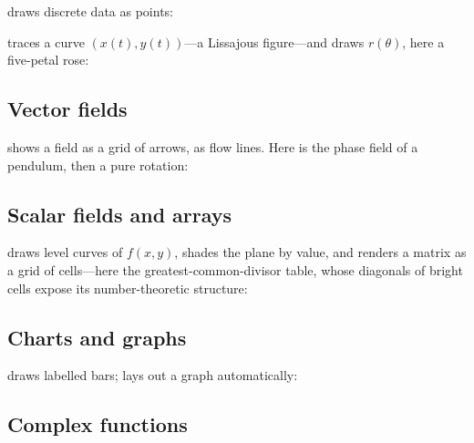 
\noindent {} draws discrete data as points:


\noindent {} traces a curve $(x(t), y(t))$---a Lissajous figure---and
 draws $r(\theta)$, here a five-petal rose:



\subsection{Vector fields}

 shows a field as a grid of arrows,  as flow lines. Here is the
phase field of a pendulum, then a pure rotation:



\subsection{Scalar fields and arrays}

 draws level curves of $f(x,y)$,  shades the plane by value,
and  renders a matrix as a grid of cells---here the greatest-common-divisor
table, whose diagonals of bright cells expose its number-theoretic structure:




\subsection{Charts and graphs}

 draws labelled bars;  lays out a graph automatically:



\subsection{Complex functions}

